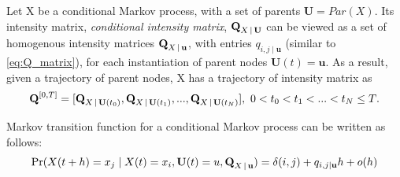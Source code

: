 Let X be a conditional Markov process, with a set of parents $ \textbf{U} = Par(X)$. Its intensity matrix, \textit{conditional intensity matrix}, $ \textbf{Q}_{X\,|\, \textbf{U}} $ can be viewed as a set of homogenous intensity matrices $ \textbf{Q}_{X\,|\, \textbf{u}} $, with entries $ q_{i,j \mid \textbf{u}} $ (similar to \autoref{eq:Q_matrix}), for each instantiation of parent nodes $ \textbf{U}(t) =\textbf{u} $.\cite{Nodelman1995} As a result, given a trajectory of parent nodes, X has a trajectory of intensity matrix as
\begin{equation}
\textbf{Q}^{[0,T]} = [\textbf{Q}_{X\given \textbf{U}(t_0)}, \textbf{Q}_{X\given \textbf{U}(t_1)}, ..., \textbf{Q}_{X\given \textbf{U}(t_N)}],\ 0<t_0<t_1<...<t_N\leq T\text{.}
\end{equation}

Markov transition function for a conditional Markov process can be written as follows:
\begin{align}
\operatorname{Pr}(X(t + h) = x_j \mid X(t)=x_i, \textbf{U}(t)=u, \textbf{Q}_{X\,|\, \textbf{u}}) = \delta(i,j) + q_{i,j \mid \textbf{u}} h + o(h)
\label{eq:CIM_trans_funct}
\end{align}


